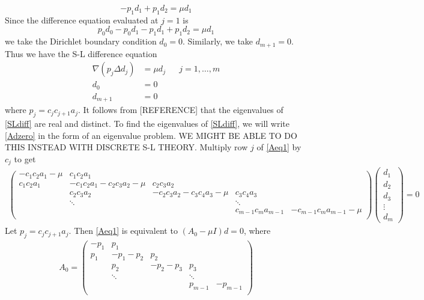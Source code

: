 \documentclass[12pt]{article}
\begin{document}
\[
-p_1 d_1 + p_1 d_2 = \mu d_1
\]
Since the difference equation evaluated at $j = 1$ is
\[
p_0 d_0 - p_0 d_1 - p_1 d_1 + p_1 d_2 = \mu d_1
\]
we take the Dirichlet boundary condition $d_0 = 0$. Similarly, we take $d_{m+1} = 0$. Thus we have the S-L difference equation
\begin{equation}\label{SLdiff}
\begin{aligned}
\nabla( p_j \Delta d_j ) &= \mu d_j && j = 1, \dots, m \\
d_0 &= 0 \\
d_{m+1} &= 0
\end{aligned}
\end{equation}
where $p_j = c_j c_{j+1} a_j$. It follows from [REFERENCE] that the eigenvalues of \eqref{SLdiff} are real and distinct. To find the eigenvalues of \eqref{SLdiff}, we will write \eqref{Adzero} in the form of an eigenvalue problem. WE MIGHT BE ABLE TO DO THIS INSTEAD WITH DISCRETE S-L THEORY. Multiply row $j$ of \eqref{Aeq1} by $c_j$ to get
\begin{align*}
\begin{pmatrix}
-c_1 c_2 a_1 - \mu & c_1 c_2 a_1 & & &  \\
c_1 c_2 a_1 & -c_1 c_2 a_1 - c_2 c_3 a_2 - \mu & c_2 c_3 a_2 \\
& c_2 c_3 a_2 & -c_2 c_3 a_2 - c_3 c_4 a_3 - \mu & c_3 c_4 a_3 \\
& \ddots & & \ddots \\
& & & c_{m-1} c_m a_{m-1} & -c_{m-1} c_m a_{m-1} - \mu \\
\end{pmatrix}
\begin{pmatrix}d_1 \\ d_2 \\ d_3 \\ \vdots \\ d_m \end{pmatrix} 
 = 0
\end{align*}
Let $p_j = c_j c_{j+1} a_j$. Then \eqref{Aeq1} is equivalent to $(A_0 - \mu I)d = 0$, where
\begin{align*}
A_0 = 
\begin{pmatrix}
-p_1 & p_1 & & &  \\
p_1 & -p_1 - p_2 & p_2 \\
& p_2 & -p_2 - p_3  & p_3 \\
& \ddots & & \ddots \\
& & & p_{m-1} & -p_{m-1} \\
\end{pmatrix}
\end{align*}
\end{document}

